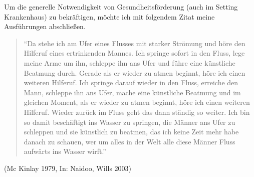 Um die generelle Notwendigkeit von Gesundheitsförderung (auch im Setting Krankenhaus) zu bekräftigen, möchte ich mit folgendem Zitat meine Ausführungen abschließen.

\begin{quotation}
"`Da stehe ich am Ufer eines Flusses mit starker Strömung und höre den Hilferuf eines ertrinkenden Mannes. Ich springe sofort in den Fluss, lege meine Arme um ihn, schleppe ihn ans Ufer und führe eine künstliche Beatmung durch. Gerade als er wieder zu atmen beginnt, höre ich einen weiteren Hilferuf. Ich springe darauf wieder in den Fluss, erreiche den Mann, schleppe ihn ans Ufer, mache eine künstliche Beatmung und im gleichen Moment, als er wieder zu atmen beginnt, höre ich einen weiteren Hilferuf. Wieder zurück im Fluss geht das dann ständig so weiter. Ich bin so damit beschäftigt ins Wasser zu springen, die Männer ans Ufer zu schleppen und sie künstlich zu beatmen, das ich keine Zeit mehr habe danach zu schauen, wer um alles in der Welt alle diese Männer Fluss aufwärts ins Wasser wirft."'
\end{quotation}

\begin{flushright}
(Mc Kinlay 1979, In: Naidoo, Wills 2003)
\end{flushright}